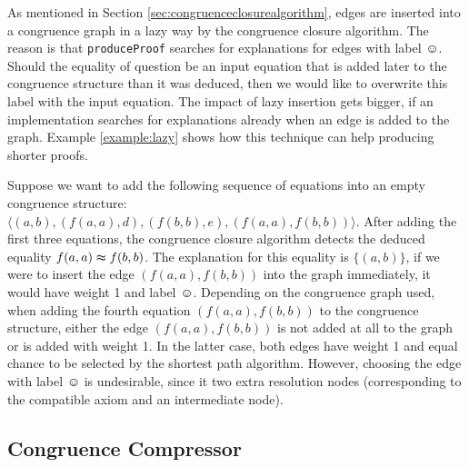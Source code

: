 As mentioned in Section \ref{sec:congruenceclosurealgorithm}, edges are inserted into a congruence graph in a lazy way by the congruence closure algorithm.
The reason is that \texttt{produceProof} searches for explanations for edges with label $\smiley$.
Should the equality of question be an input equation that is added later to the congruence structure than it was deduced, then we would like to overwrite this label with the input equation.
The impact of lazy insertion gets bigger, if an implementation searches for explanations already when an edge is added to the graph.
Example \ref{example:lazy} shows how this technique can help producing shorter proofs.

\begin{example}
\label{example:lazy}
Suppose we want to add the following sequence of equations into an empty congruence structure: $\langle (a,b),(f(a,a),d),(f(b,b),e),(f(a,a),f(b,b)) \rangle$.
After adding the first three equations, the congruence closure algorithm detects the deduced equality $f(a,a) \thickapprox f(b,b)$.
The explanation for this equality is $\{(a,b)\}$, if we were to insert the edge $(f(a,a),f(b,b))$ into the graph immediately, it would have weight 1 and label $\smiley$.
Depending on the congruence graph used, when adding the fourth equation $(f(a,a),f(b,b))$ to the congruence structure, either the edge $(f(a,a),f(b,b))$ is not added at all to the graph or is added with weight 1.
In the latter case, both edges have weight 1 and equal chance to be selected by the shortest path algorithm.
However, choosing the edge with label $\smiley$ is undesirable, since it two extra resolution nodes (corresponding to the compatible axiom and an intermediate node).

\end{example}

\FloatBarrier

\subsection*{Congruence Compressor}

